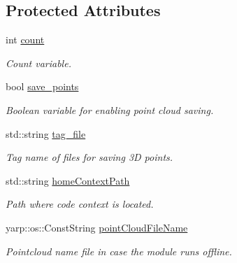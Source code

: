 \subsection*{Protected Attributes}
\begin{DoxyCompactItemize}
\item 
\mbox{\label{classSuperqComputation_a2503498f171c08ccba94f754a7554cc3}} 
int \mbox{\hyperlink{classSuperqComputation_a2503498f171c08ccba94f754a7554cc3}{count}}
\begin{DoxyCompactList}\small\item\em Count variable. \end{DoxyCompactList}\item 
\mbox{\label{classSuperqComputation_a61546ef4a16a8daf6a2a92e5fa16eaf5}} 
bool \mbox{\hyperlink{classSuperqComputation_a61546ef4a16a8daf6a2a92e5fa16eaf5}{save\+\_\+points}}
\begin{DoxyCompactList}\small\item\em Boolean variable for enabling point cloud saving. \end{DoxyCompactList}\item 
\mbox{\label{classSuperqComputation_aae8ace8205eac99d97d54f3213bf708b}} 
std\+::string \mbox{\hyperlink{classSuperqComputation_aae8ace8205eac99d97d54f3213bf708b}{tag\+\_\+file}}
\begin{DoxyCompactList}\small\item\em Tag name of files for saving 3D points. \end{DoxyCompactList}\item 
\mbox{\label{classSuperqComputation_a8e71181154ad0c3dfa8d37b2201e290e}} 
std\+::string \mbox{\hyperlink{classSuperqComputation_a8e71181154ad0c3dfa8d37b2201e290e}{home\+Context\+Path}}
\begin{DoxyCompactList}\small\item\em Path where code context is located. \end{DoxyCompactList}\item 
\mbox{\label{classSuperqComputation_a83ea1977c3822c48c917a97068d77f44}} 
yarp\+::os\+::\+Const\+String \mbox{\hyperlink{classSuperqComputation_a83ea1977c3822c48c917a97068d77f44}{point\+Cloud\+File\+Name}}
\begin{DoxyCompactList}\small\item\em Pointcloud name file in case the module runs offline. \end{DoxyCompactList}\item 
\mbox{\label{classSuperqComputation_ab35ce370798ac4744994185539b25a54}} 

\end{DoxyCompactItemize}
